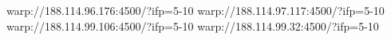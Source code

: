 warp://188.114.96.176:4500/?ifp=5-10
warp://188.114.97.117:4500/?ifp=5-10
warp://188.114.99.106:4500/?ifp=5-10
warp://188.114.99.32:4500/?ifp=5-10
